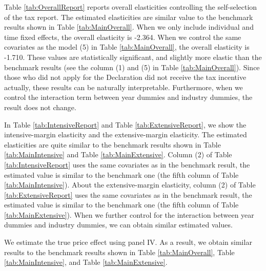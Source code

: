 \documentclass[
  11pt,
  a4paper,
]{article}
\begin{document}
Table \ref{tab:OverallReport} reports overall elasticities controlling the self-selection of the tax report.
The estimated elasticities are similar value to the benchmark results shown in Table \ref{tab:MainOverall}.
When we only include individual and time fixed effects, the overall elasticity is -2.364.
When we control the same covariates as the model (5) in Table \ref{tab:MainOverall},
the overall elasticity is -1.710.
These values are statistically significant,
and slightly more elastic than the benchmark results
(see the column (1) and (5) in Table \ref{tab:MainOverall}).
Since those who did not apply for the Declaration did not receive the tax incentive actually,
these results can be naturally interpretable.
Furthermore, when we control the interaction term between year dummies and industry dummies,
the result does not change.

In Table \ref{tab:IntensiveReport} and Table \ref{tab:ExtensiveReport},
we show the intensive-margin elasticity and the extensive-margin elasticity.
The estimated elasticities are quite similar to the benchmark results
shown in Table \ref{tab:MainIntensive} and Table \ref{tab:MainExtensive}.
Column (2) of Table \ref{tab:IntensiveReport} uses the same covariates as in the benchmark result,
the estimated value is similar to the benchmark one (the fifth column of Table \ref{tab:MainIntensive}).
About the extensive-margin elasticity,
column (2) of Table \ref{tab:ExtensiveReport} uses the same covariates as in the benchmark result,
the estimated value is similar to the benchmark one (the fifth column of Table \ref{tab:MainExtensive}).
When we further control for the interaction between year dummies and industry dummies,
we can obtain similar estimated values.

We estimate the true price effect using panel IV.
As a result, we obtain similar results to the benchmark results
shown in Table \ref{tab:MainOverall}, Table \ref{tab:MainIntensive}, and Table \ref{tab:MainExtensive}.
\end{document}
